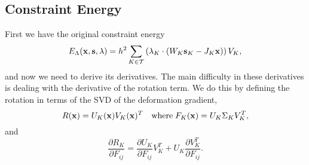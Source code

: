 \subsection{Constraint Energy}

First we have the original constraint energy
\begin{equation}
E_\Lambda (\mathbf{x}, \mathbf{s}, \mathbf{\lambda}) = h^2 \sum_{K \in \mathcal{T}} \left( \mathbf{\lambda}_K \cdot (W_K \mathbf{s}_K - J_K \mathbf{x}) \right) V_K,
\end{equation}
and now we need to derive its derivatives.
The main difficulty in these derivatives is dealing with the derivative of the rotation term.
We do this by defining the rotation in terms of the SVD of the deformation gradient,
\begin{equation}
R(\mathbf{x}) = U_K(\mathbf{x}) V_K(\mathbf{x})^T \quad \text{where} \; F_K(\mathbf{x}) = U_K \Sigma_K V_K^T,
\end{equation}
and
\begin{equation}
\frac{\partial R_K}{\partial F_{ij}} = \frac{\partial U_K}{\partial F_{ij}}V_K^T
+ U_K \frac{\partial V_K^T}{\partial F_{ij}}.
\end{equation}


